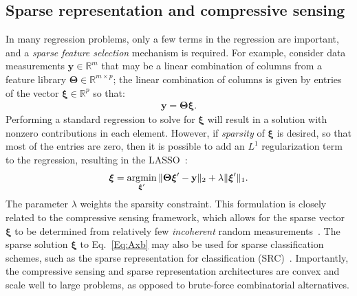 \documentclass[onecolumn,11pt]{article}
\DeclareMathOperator*{\argmin}{arg\rm{}min}
\newcommand{\by}{\mathbf{y}}
\newcommand{\bxi}{\boldsymbol{\xi}}
\newcommand{\bTheta}{\boldsymbol{\Theta}}
\begin{document}
\subsection{Sparse representation and compressive sensing}\label{sec:SpaRep}
In many regression problems, only a few terms in the regression are important, and a \emph{sparse feature selection} mechanism is required.  
For example, consider data measurements $\by\in\mathbb{R}^m$ that may be a linear combination of columns from a feature library $\bTheta\in\mathbb{R}^{m\times p}$; the linear combination of columns is given by entries of the vector $\bxi\in\mathbb{R}^p$ so that:
\begin{eqnarray}
\by=\bTheta \bxi.\label{Eq:Axb}
\end{eqnarray}
Performing a standard regression to solve for $\bxi$ will result in a solution with nonzero contributions in each element.  
However, if \emph{sparsity} of $\bxi$ is desired, so that most of the entries are zero, then it is possible to add an $L^1$ regularization term to the regression, resulting in the LASSO~\cite{Hastie2009book,James2013book,Tibshirani1996lasso}:
\begin{eqnarray}
\bxi = \argmin_{\bxi'}\|\bTheta\bxi'-\by\|_2 + \lambda\|\bxi'\|_1.\label{Eq:LASSO}
\end{eqnarray}
The parameter $\lambda$ weights the sparsity constraint.  This formulation is closely related to the compressive sensing framework, which allows for the sparse vector $\bxi$ to be determined from relatively few \emph{incoherent} random measurements~\cite{Donoho2006ieeetit,Candes2006bieeetit,Candes2006cpam,Candes2006picm,Baraniuk2007ieeespm,Tropp:2007}.  
The sparse solution $\bxi$ to Eq.~\ref{Eq:Axb} may also be used for sparse classification schemes, such as the sparse representation for classification (SRC)~\cite{Wright2009ieeetpami}.  
Importantly, the compressive sensing and sparse representation architectures are convex and scale well to large problems, as opposed to brute-force combinatorial alternatives.

\end{document}

